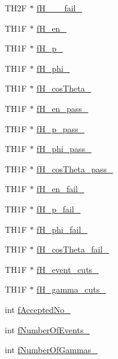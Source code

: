 \begin{DoxyCompactItemize}
\item 
T\+H2F $\ast$ \hyperlink{classPsDecay_a929f173b06a0cee44ea090f5d35d15c8}{f\+H\+\_\+\_\+\_\+fail\+\_\+}
\item 
T\+H1F $\ast$ \hyperlink{classPsDecay_a6dfa432418e7f7e49ee6635e4df80c70}{f\+H\+\_\+en\+\_\+}
\item 
T\+H1F $\ast$ \hyperlink{classPsDecay_a7dc7f2407d80e5439a397632723ed60d}{f\+H\+\_\+p\+\_\+}
\item 
T\+H1F $\ast$ \hyperlink{classPsDecay_ae501ea764ce924148fca7d6b1690c40b}{f\+H\+\_\+phi\+\_\+}
\item 
T\+H1F $\ast$ \hyperlink{classPsDecay_ac3abee8f113229cc7fc3b5c6822b08c9}{f\+H\+\_\+cos\+Theta\+\_\+}
\item 
T\+H1F $\ast$ \hyperlink{classPsDecay_a3d42050216fe2a6d43d63fd0a0a6e94a}{f\+H\+\_\+en\+\_\+pass\+\_\+}
\item 
T\+H1F $\ast$ \hyperlink{classPsDecay_a65d304f41e588f9588cb551826989dae}{f\+H\+\_\+p\+\_\+pass\+\_\+}
\item 
T\+H1F $\ast$ \hyperlink{classPsDecay_a8f1c6d7069dad26f9fab9e319e940db2}{f\+H\+\_\+phi\+\_\+pass\+\_\+}
\item 
T\+H1F $\ast$ \hyperlink{classPsDecay_aa35962b605f27e790af869e62b8e30b0}{f\+H\+\_\+cos\+Theta\+\_\+pass\+\_\+}
\item 
T\+H1F $\ast$ \hyperlink{classPsDecay_ad545f241da3ae36ce43bc082a0c71183}{f\+H\+\_\+en\+\_\+fail\+\_\+}
\item 
T\+H1F $\ast$ \hyperlink{classPsDecay_a6e4560ff2d8b93cb0654535579fef5cf}{f\+H\+\_\+p\+\_\+fail\+\_\+}
\item 
T\+H1F $\ast$ \hyperlink{classPsDecay_abb74a986a7f2115c0113b2a0702b7e80}{f\+H\+\_\+phi\+\_\+fail\+\_\+}
\item 
T\+H1F $\ast$ \hyperlink{classPsDecay_a08392542526dfd2f80ed110843b477a4}{f\+H\+\_\+cos\+Theta\+\_\+fail\+\_\+}
\item 
T\+H1F $\ast$ \hyperlink{classPsDecay_adedcdf6c1878a93c5f2c3809f6ced052}{f\+H\+\_\+event\+\_\+cuts\+\_\+}
\item 
T\+H1F $\ast$ \hyperlink{classPsDecay_aaa94c7a338ede5d9b6cfbdd5a6a72d4e}{f\+H\+\_\+gamma\+\_\+cuts\+\_\+}
\item 
int \hyperlink{classPsDecay_a87f76faf8bed97d0297fa9fc5a8058b6}{f\+Accepted\+No\+\_\+}
\item 
int \hyperlink{classPsDecay_a32e3f4712d0c7a995d0b8c959c720e79}{f\+Number\+Of\+Events\+\_\+}
\item 
int \hyperlink{classPsDecay_a7181fb08b4524a9f222bb5178e2b33b4}{f\+Number\+Of\+Gammas\+\_\+}
\end{DoxyCompactItemize}


